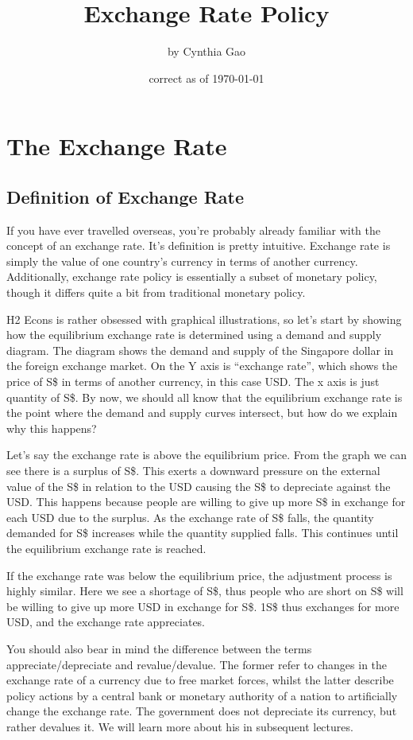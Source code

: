 \documentclass[DIV=classic,11pt,numbers=noenddot,parskip]{scrartcl}
\title{Exchange Rate Policy}
\author{by Cynthia Gao}
\date{\small correct as of \today}
\begin{document}
\maketitle
\tableofcontents
\newpage
\section{The Exchange Rate}
\subsection{Definition of Exchange Rate}
If you have ever travelled overseas, you’re probably already familiar with the concept of an exchange rate. It’s definition is pretty intuitive. Exchange rate is simply the value of one country’s currency in terms of another currency. Additionally, exchange rate policy is essentially a subset of monetary policy, though it differs quite a bit from traditional monetary policy.

H2 Econs is rather obsessed with graphical illustrations, so let’s start by showing how the equilibrium exchange rate is determined using a demand and supply diagram. The diagram shows the demand and supply of the Singapore dollar in the foreign exchange market. On the Y axis is “exchange rate”, which shows the price of S\$ in terms of another currency, in this case USD. The x axis is just quantity of S\$. By now, we should all know that the equilibrium exchange rate is the point where the demand and supply curves intersect, but how do we explain why this happens?

Let’s say the exchange rate is above the equilibrium price. From the graph we can see there is a surplus of S\$. This exerts a downward pressure on the external value of the S\$ in relation to the USD causing the S\$ to depreciate against the USD. This happens because people are willing to give up more S\$ in exchange for each USD due to the surplus. As the exchange rate of S\$ falls, the quantity demanded for S\$ increases while the quantity supplied falls. This continues until the equilibrium exchange rate is reached.

If the exchange rate was below the equilibrium price, the adjustment process is highly similar. Here we see a shortage of S\$, thus people who are short on S\$ will be willing to give up more USD in exchange for S\$. 1S\$ thus exchanges for more USD, and the exchange rate appreciates.

You should also bear in mind the difference between the terms appreciate/depreciate and revalue/devalue. The former refer to changes in the exchange rate of a currency due to free market forces, whilst the latter describe policy actions by a central bank or monetary authority of a nation to artificially change the exchange rate. The government does not depreciate its currency, but rather devalues it. We will learn more about his in subsequent lectures.
\end{document}
